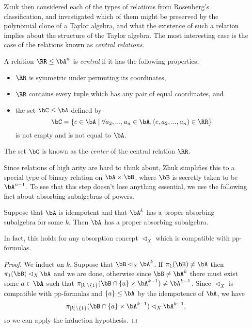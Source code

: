 Zhuk then considered each of the types of relations from Rosenberg's classification, and investigated which of them might be preserved by the polynomial clone of a Taylor algebra, and what the existence of such a relation implies about the structure of the Taylor algebra. The most interesting case is the case of the relations known as \emph{central relations}.

\begin{defn} A relation $\RR \le \bA^n$ is \emph{central} if it has the following properties:
\begin{itemize}
\item $\RR$ is symmetric under permuting its coordinates,
\item $\RR$ contains every tuple which has any pair of equal coordinates, and
\item the set $\bC \le \bA$ defined by
\[
\bC = \{c \in \bA \mid \forall a_2, ..., a_n \in \bA, (c,a_2,...,a_n) \in \RR\}
\]
is not empty and is not equal to $\bA$.
\end{itemize}
The set $\bC$ is known as the \emph{center} of the central relation $\RR$.
\end{defn}

Since relations of high arity are hard to think about, Zhuk simplifies this to a special type of binary relation on $\bA \times \bB$, where $\bB$ is secretly taken to be $\bA^{n-1}$. To see that this step doesn't lose anything essential, we use the following fact about absorbing subalgebras of powers.

\begin{prop} Suppose that $\bA$ is idempotent and that $\bA^k$ has a proper absorbing subalgebra for some $k$. Then $\bA$ has a proper absorbing subalgebra.

In fact, this holds for any absorption concept $\lhd_X$ which is compatible with pp-formulas.
\end{prop}
\begin{proof} We induct on $k$. Suppose that $\bB \lhd_X \bA^k$. If $\pi_1(\bB) \ne \bA$ then $\pi_1(\bB) \lhd_X \bA$ and we are done, otherwise since $\bB \ne \bA^k$ there must exist some $a \in \bA$ such that $\pi_{[k]\setminus\{1\}}(\bB \cap \{a\} \times \bA^{k-1}) \ne \bA^{k-1}$. Since $\lhd_X$ is compatible with pp-formulas and $\{a\} \le \bA$ by the idempotence of $\bA$, we have
\[
\pi_{[k]\setminus\{1\}}(\bB \cap \{a\} \times \bA^{k-1}) \lhd_X \bA^{k-1},
\]
so we can apply the induction hypothesis.
\end{proof}

